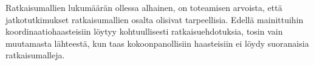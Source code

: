 Ratkaisumallien lukumäärän ollessa alhainen, on toteamisen arvoista, että jatkotutkimukset ratkaisumallien osalta olisivat tarpeellisia. Edellä mainittuihin koordinaatiohaasteisiin löytyy kohtuullisesti ratkaisuehdotuksia, tosin vain muutamasta lähteestä, kun taas kokoonpanollisiin haasteisiin ei löydy suoranaisia ratkaisumalleja.
